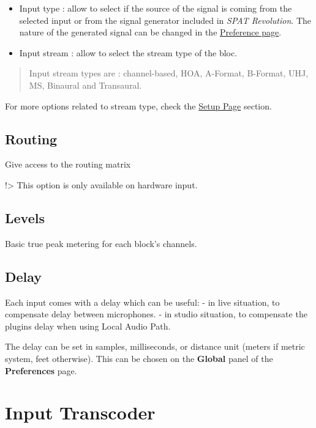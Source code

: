 \documentclass[
  letterpaper,
  DIV=11,
  numbers=noendperiod]{scrreport}
\providecommand{\tightlist}{%
  \setlength{\itemsep}{0pt}\setlength{\parskip}{0pt}}\usepackage{longtable,booktabs,array}
\begin{document}
\begin{itemize}
\tightlist
\item
  Input type : allow to select if the source of the signal is coming
  from the selected input or from the signal generator included in
  \emph{SPAT Revolution}. The nature of the generated signal can be
  changed in the \href{Application_Preferences.md}{Preference page}.
\item
  Input stream : allow to select the stream type of the bloc.
\end{itemize}

\begin{quote}
Input stream types are : channel-based, HOA, A-Format, B-Format, UHJ,
MS, Binaural and Transaural.
\end{quote}

For more options related to stream type, check the
\href{Spat_Environment_Setup_Page.md}{Setup Page} section.

\hypertarget{routing}{%
\section{Routing}\label{routing}}

Give access to the routing matrix

!\textgreater{} This option is only available on hardware input.

\hypertarget{levels}{%
\section{Levels}\label{levels}}

Basic true peak metering for each block's channels.

\hypertarget{delay}{%
\section{Delay}\label{delay}}

Each input comes with a delay which can be useful: - in live situation,
to compensate delay between microphones. - in studio situation, to
compensate the plugins delay when using Local Audio Path.

The delay can be set in samples, milliseconds, or distance unit (meters
if metric system, feet otherwise). This can be chosen on the
\textbf{Global} panel of the \textbf{Preferences} page.

\hypertarget{input-transcoder}{%
\chapter{Input Transcoder}\label{input-transcoder}}
\end{document}
